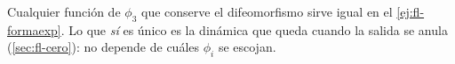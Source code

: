 
\begin{cuidado}
Cualquier función de $\phi_3$ que conserve el difeomorfismo sirve igual en el \cref{ej:fl-formaexp}. Lo que \emph{sí} es único es la dinámica que queda cuando la salida se anula (\cref{sec:fl-cero}): no depende de cuáles $\phi_i$ se escojan.
\end{cuidado}
